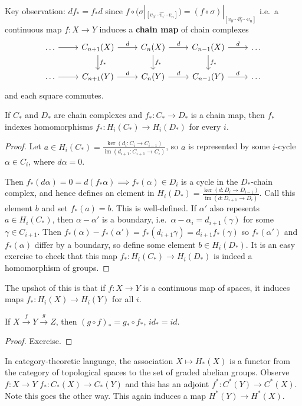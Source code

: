 \documentclass{article}
\DeclareMathOperator{\im}{im}
\begin{document}
Key observation: $df_* = f_*d$ since $f \circ (\sigma|_{[v_0 \dotsm \hat{v_i} \dotsm v_n]}) = (f \circ \sigma)|_{[v_0 \dotsm \hat{v_i} \dotsm v_n]}$
i.e.\ a continuous map $f: X \to Y$ induces a \textbf{chain map} of chain complexes
\begin{equation*}
  \begin{tikzcd}
    \dots \rar & C_{n+1}(X) \rar{d} \dar{f_*} & C_n(X) \rar{d} \dar{f_*} & C_{n-1}(X) \rar{d} \dar{f_*} & \dots \\
    \dots \rar & C_{n+1}(Y) \rar{d}  & C_n(Y) \rar{d}  & C_{n-1}(Y) \rar{d}  & \dots
  \end{tikzcd}
\end{equation*}
and each square commutes.
\begin{lemma}
  If $C_*$ and $D_*$ are chain complexes and $f_*:C_* \to D_*$ is a chain map, then $f_*$ indexes homomorphisms $f_*:H_i(C_*) \to H_i(D_*)$ for every $i$.
\end{lemma}
\begin{proof}
  Let $a \in H_i(C_*) = \frac{\ker(d_i:C_i \to C_{i-1})}{\im(d_{i+1}:C_{i+1} \to C_i)}$, so $a$ is represented by some $i$-cycle $\alpha \in C_i$, where $d \alpha = 0$.

  Then $f_*(d\alpha) = 0 = d(f_* \alpha) \implies f_*(\alpha) \in D_i$ is a cycle in the $D_*$-chain complex, and hence defines an element in $H_i(D_*) = \frac{\ker(d:D_i \to D_{i-1})}{\im(d:D_{i+1}\to D_i)}$. Call this element $b$ and set $f_*(a) = b$.
  This is well-defined.
  If $\alpha'$ also repesents $a \in H_i(C_*)$, then $\alpha-\alpha'$ is a boundary, i.e.\ $\alpha-\alpha_i = d_{i+1}(\gamma)$ for some $\gamma \in C_{i+1}$.
  Then $f_*(\alpha) - f_*(\alpha') = f_*(d_{i+1}\gamma) = d_{i+1} f_*(\gamma)$ so $f_*(\alpha')$ and $f_*(\alpha)$ differ by a boundary, so define some element $b \in H_i(D_*)$.
  It is an easy exercise to check that this map $f_*:H_i(C_*) \to H_i(D_*)$ is indeed a homomorphism of groups.
\end{proof}
The upshot of this is that if $f:X\to Y$ is a continuous map of spaces, it induces maps $f_*:H_i(X) \to H_i(Y)$ for all $i$.
\begin{lemma}
  If $X \xrightarrow{f} Y \xrightarrow{g} Z$, then $(g \circ f)_* = g_* \circ f_*$, $id_* = id$.
\end{lemma}
\begin{proof}
  Exercise.
\end{proof}
In category-theoretic language, the association $X \mapsto H_*(X)$ is a functor from the category of topological spaces to the set of graded abelian groups.
Observe $f:X \to Y$ $f_*:C_*(X) \to C_*(Y)$ and this has an adjoint $f^*: C^*(Y) \to C^*(X)$.
Note this goes the other way. This again induces a map $H^*(Y) \to H^*(X)$.
\end{document}
